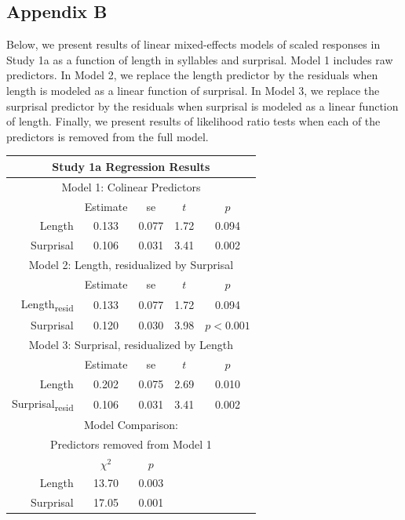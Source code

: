 \subsection{Appendix B}

Below, we present results of linear mixed-effects models of scaled responses in Study 1a as a function of length in syllables and surprisal.
Model 1 includes raw predictors.
In Model 2, we replace the length predictor by the residuals when length is modeled as a linear function of surprisal.
In Model 3, we replace the surprisal predictor by the residuals when surprisal is modeled as a linear function of length.
Finally, we present results of likelihood ratio tests when each of the predictors is removed from the full model.

\vspace{4mm}

\noindent
\footnotesize{
\begin{tabular}{r|cccc}
\hline
\hline
\multicolumn{5}{c}{\textbf{Study 1a Regression Results}} \\
\hline
\hline
\multicolumn{5}{c}{Model 1: Colinear Predictors} \\
& Estimate & se & $t$ & $p$ \\
\hline
Length & 0.133 & 0.077 & 1.72 & 0.094 \\
Surprisal & 0.106 & 0.031 & 3.41 & 0.002 \\
\hline
\hline
\multicolumn{5}{c}{Model 2: Length, residualized by Surprisal} \\
& Estimate & se & $t$ & $p$ \\
\hline
Length\textsubscript{resid} & 0.133 & 0.077 & 1.72 & 0.094 \\
Surprisal & 0.120 & 0.030 & 3.98 & $p<0.001$ \\
\hline
\hline
\multicolumn{5}{c}{Model 3: Surprisal, residualized by Length} \\
& Estimate & se & $t$ & $p$ \\
\hline
Length & 0.202 & 0.075 & 2.69 & 0.010 \\
Surprisal\textsubscript{resid} & 0.106 & 0.031 & 3.41 & 0.002 \\
\hline
\hline
\multicolumn{5}{c}{Model Comparison:} \\
\multicolumn{5}{c}{Predictors removed from Model 1} \\
& $\chi^2$ & $p$ \\
\hline
Length & 13.70 & 0.003 \\
Surprisal & 17.05 & 0.001 \\
\hline
\hline
\end{tabular}
}



